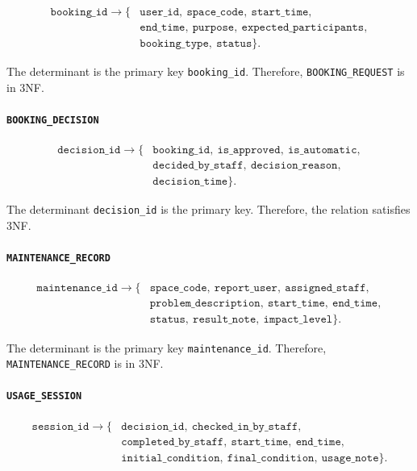 \[
\begin{aligned}
\texttt{booking\_id} \rightarrow \{&
\texttt{user\_id},\ \texttt{space\_code},\ \texttt{start\_time},\\
&\texttt{end\_time},\ \texttt{purpose},\ \texttt{expected\_participants},\\
&\texttt{booking\_type},\ \texttt{status}\}.
\end{aligned}
\]

The determinant is the primary key \texttt{booking\_id}. Therefore,
\texttt{BOOKING\_REQUEST} is in 3NF.

\paragraph{\texttt{BOOKING\_DECISION}}

\[
\begin{aligned}
\texttt{decision\_id} \rightarrow \{&
\texttt{booking\_id},\ \texttt{is\_approved},\ \texttt{is\_automatic},\\
&\texttt{decided\_by\_staff},\ \texttt{decision\_reason},\\
&\texttt{decision\_time}\}.
\end{aligned}
\]

The determinant \texttt{decision\_id} is the primary key. Therefore,
the relation satisfies 3NF.

\paragraph{\texttt{MAINTENANCE\_RECORD}}

\[
\begin{aligned}
\texttt{maintenance\_id} \rightarrow \{&
\texttt{space\_code},\ \texttt{report\_user},\ \texttt{assigned\_staff},\\
&\texttt{problem\_description},\ \texttt{start\_time},\ \texttt{end\_time},\\
&\texttt{status},\ \texttt{result\_note},\ \texttt{impact\_level}\}.
\end{aligned}
\]

The determinant is the primary key \texttt{maintenance\_id}.
Therefore, \texttt{MAINTENANCE\_RECORD} is in 3NF.

\paragraph{\texttt{USAGE\_SESSION}}

\[
\begin{aligned}
\texttt{session\_id} \rightarrow \{&
\texttt{decision\_id},\ \texttt{checked\_in\_by\_staff},\\
&\texttt{completed\_by\_staff},\ \texttt{start\_time},\ \texttt{end\_time},\\
&\texttt{initial\_condition},\ \texttt{final\_condition},\ \texttt{usage\_note}\}.
\end{aligned}
\]

